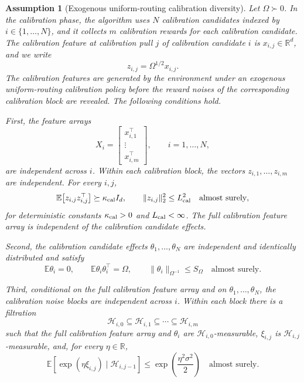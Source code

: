 \documentclass{article} %
\newtheorem{assumption}{Assumption}
\begin{document}
\begin{assumption}[Exogenous uniform-routing calibration diversity]
\label{ass:exogenous-uniform-calibration-diversity-final}
Let \(\Omega\succ0\).  In the calibration phase, the algorithm uses
\(N\) calibration candidates indexed by \(i\in\{1,\ldots,N\}\), and it collects
\(m\) calibration rewards for each calibration candidate.  The calibration
feature at calibration pull \(j\) of calibration candidate \(i\) is
\(x_{i,j}\in\mathbb{R}^d\), and we write
\[
z_{i,j}=\Omega^{1/2}x_{i,j}.
\]
The calibration features are generated by the environment under an exogenous
uniform-routing calibration policy before the reward noises of the corresponding
calibration block are revealed.  The following conditions hold.

First, the feature arrays
\[
X_i=
\begin{bmatrix}
x_{i,1}^{\top}\\
\vdots\\
x_{i,m}^{\top}
\end{bmatrix},
\qquad i=1,\ldots,N,
\]
are independent across \(i\).  Within each calibration block, the vectors
\(z_{i,1},\ldots,z_{i,m}\) are independent.  For every \(i,j\),
\[
\mathbb{E}\!\left[z_{i,j}z_{i,j}^{\top}\right]\succeq \kappa_{\rm cal} I_d,
\qquad
\|z_{i,j}\|_2^2\le L_{\rm cal}^2
\quad\text{almost surely},
\]
for deterministic constants \(\kappa_{\rm cal}>0\) and \(L_{\rm cal}<\infty\).
The full calibration feature array is independent of the calibration candidate
effects.

Second, the calibration candidate effects \(\theta_1,\ldots,\theta_N\) are
independent and identically distributed and satisfy
\[
\mathbb{E}\theta_i=0,
\qquad
\mathbb{E}\theta_i\theta_i^\top=\Omega,
\qquad
\|\theta_i\|_{\Omega^{-1}}\le S_\Omega
\quad\text{almost surely}.
\]

Third, conditional on the full calibration feature array and on
\(\theta_1,\ldots,\theta_N\), the calibration noise blocks are independent
across \(i\).  Within each block there is a filtration
\[
\mathcal{H}_{i,0}\subseteq\mathcal{H}_{i,1}\subseteq\cdots\subseteq
\mathcal{H}_{i,m}
\]
such that the full calibration feature array and \(\theta_i\) are
\(\mathcal{H}_{i,0}\)-measurable, \(\xi_{i,j}\) is
\(\mathcal{H}_{i,j}\)-measurable, and, for every \(\eta\in\mathbb{R}\),
\[
\mathbb{E}\!\left[
\exp(\eta\xi_{i,j})\mid \mathcal{H}_{i,j-1}
\right]
\le
\exp\!\left(\frac{\eta^2\sigma^2}{2}\right)
\quad\text{almost surely}.
\]
\end{assumption}
\end{document}
